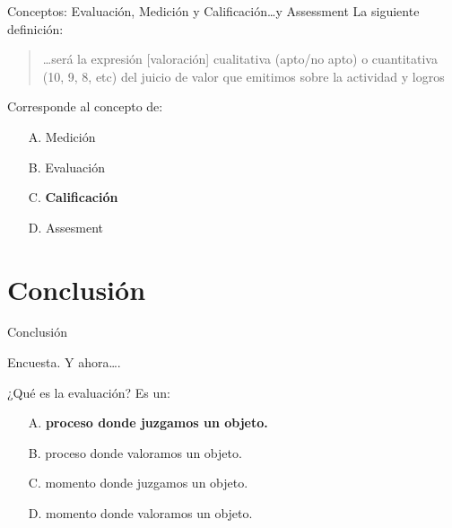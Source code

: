 \documentclass[11pt, aspectratio=169, xcolor=table]{beamer}
\begin{document}
	\begin{frame}{Conceptos: Evaluación, Medición y Calificación…y Assessment}
		La siguiente definición:
		\begin{quote}
			\dots será la expresión [valoración] cualitativa (apto/no apto) o cuantitativa (10, 9, 8, etc) del juicio de valor que emitimos sobre la actividad y logros
		\end{quote}
		\begin{flushright}
			\cite{RUIZ2009}
		\end{flushright}
		Corresponde al concepto de:
		\begin{enumerate}
			\item[A.] Medición
			\item[B.] Evaluación
			\item[C.] \textbf<2->{Calificación}
			\item[D.] Assesment
		\end{enumerate}
	\end{frame}

	\section{Conclusión}
	
	\begin{frame}{Conclusión}
		\begin{minipage}[c][0.01cm]{\textwidth}
			\centering
		\end{minipage}
			
	\end{frame}

	\begin{frame}{Encuesta. Y ahora….}
		\begin{block}{¿Qué es la evaluación?}
			Es un:
			\begin{enumerate}
				\item[A.] \textbf<2->{proceso donde juzgamos un objeto.}
				\item[B.] proceso donde valoramos un objeto.
				\item[C.] momento donde juzgamos un objeto.
				\item[D.] momento donde valoramos un objeto.
			\end{enumerate}
		\end{block}
	\end{frame}
\end{document}
